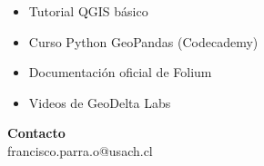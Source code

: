 \documentclass[11pt,a4paper]{article}
\begin{document}
\begin{itemize}[leftmargin=*]
    \item Tutorial QGIS básico
    \item Curso Python GeoPandas (Codecademy)
    \item Documentación oficial de Folium
    \item Videos de GeoDelta Labs
\end{itemize}


\vspace{0.5cm}

\begin{tcolorbox}[colback=gray!10,colframe=gray!50]
\centering
\textbf{Contacto}\\[0.2cm]
 francisco.parra.o@usach.cl
\end{tcolorbox}
\end{document}

